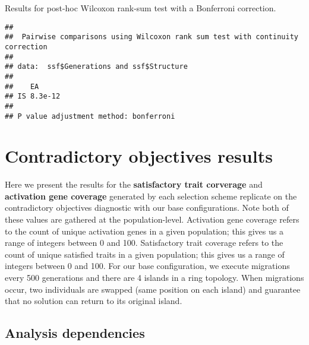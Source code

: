 \documentclass[]{book}
\newenvironment{Shaded}{\begin{snugshade}}{\end{snugshade}}
\newcommand{\DataTypeTok}[1]{\textcolor[rgb]{0.13,0.29,0.53}{#1}}
\newcommand{\KeywordTok}[1]{\textcolor[rgb]{0.13,0.29,0.53}{\textbf{#1}}}
\newcommand{\NormalTok}[1]{#1}
\newcommand{\OperatorTok}[1]{\textcolor[rgb]{0.81,0.36,0.00}{\textbf{#1}}}
\newcommand{\OtherTok}[1]{\textcolor[rgb]{0.56,0.35,0.01}{#1}}
\newcommand{\StringTok}[1]{\textcolor[rgb]{0.31,0.60,0.02}{#1}}
\begin{document}
Results for post-hoc Wilcoxon rank-sum test with a Bonferroni correction.

\begin{Shaded}
\end{Shaded}

\begin{verbatim}
## 
##  Pairwise comparisons using Wilcoxon rank sum test with continuity correction 
## 
## data:  ssf$Generations and ssf$Structure 
## 
##    EA     
## IS 8.3e-12
## 
## P value adjustment method: bonferroni
\end{verbatim}

\hypertarget{contradictory-objectives-results}{%
\chapter{Contradictory objectives results}\label{contradictory-objectives-results}}

Here we present the results for the \textbf{satisfactory trait corverage} and \textbf{activation gene coverage} generated by each selection scheme replicate on the contradictory objectives diagnostic with our base configurations.
Note both of these values are gathered at the population-level.
Activation gene coverage refers to the count of unique activation genes in a given population; this gives us a range of integers between 0 and 100.
Satisfactory trait coverage refers to the count of unique satisfied traits in a given population; this gives us a range of integers between 0 and 100.
For our base configuration, we execute migrations every 500 generations and there are 4 islands in a ring topology.
When migrations occur, two individuals are swapped (same position on each island) and guarantee that no solution can return to its original island.

\hypertarget{analysis-dependencies-2}{%
\section{Analysis dependencies}\label{analysis-dependencies-2}}
\end{document}

